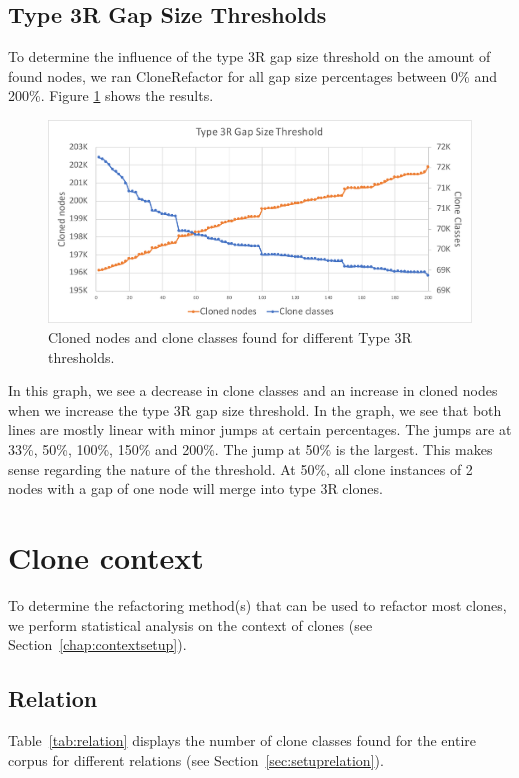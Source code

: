 \subsection{Type 3R Gap Size Thresholds}
To determine the influence of the type 3R gap size threshold on the amount of found nodes, we ran CloneRefactor for all gap size percentages between 0\% and 200\%. Figure \ref{fig:t3rgraph} shows the results.

\begin{figure}[H]
  \includegraphics[width=1\textwidth]{img/T3R}
  \caption{Cloned nodes and clone classes found for different Type 3R thresholds.}
  \label{fig:t3rgraph}
\end{figure}

In this graph, we see a decrease in clone classes and an increase in cloned nodes when we increase the type 3R gap size threshold. In the graph, we see that both lines are mostly linear with minor jumps at certain percentages. The jumps are at 33\%, 50\%, 100\%, 150\% and 200\%. The jump at 50\% is the largest. This makes sense regarding the nature of the threshold. At 50\%, all clone instances of 2 nodes with a gap of one node will merge into type 3R clones.

\section{Clone context}
To determine the refactoring method(s) that can be used to refactor most clones, we perform statistical analysis on the context of clones (see Section~\ref{chap:contextsetup}).

\subsection{Relation} \label{sec:relationresults}
Table~\ref{tab:relation} displays the number of clone classes found for the entire corpus for different relations (see Section~\ref{sec:setuprelation}).

